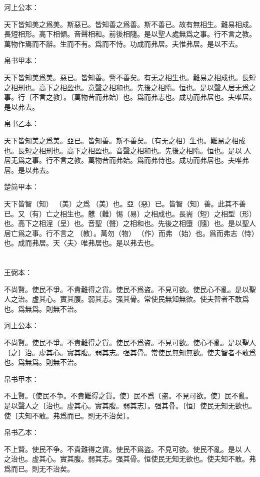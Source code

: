 \documentclass[a5paper]{ctexbook}
\begin{document}
    河上公本：

    天下皆知美之爲美。斯惡已。皆知善之爲善。斯不善已。故有無相生。難易相成。長短相形。高下相傾。音聲相和。前後相隨。是以聖人處無爲之事。行不言之教。萬物作焉而不辭。生而不有。爲而不恃。功成而弗居。夫惟弗居。是以不去。

    帛书甲本：

    天下皆知美爲美。惡已。皆知善。訾不善矣。有无之相生也。難易之相成也。長短之相刑也。高下之相盈也。意聲之相和也。先後之相隋。恒也。是以聲人居无爲之事。行〔不言之教〕。〔萬物昔而弗始〕也。爲而弗志也。成功而弗居也。夫唯居。是以弗去。

    帛书乙本：

    天下皆知美之爲美。亞已。皆知善。斯不善矣。〔有无之相〕生也。難易之相成也。長短之相刑也。高下之相盈也。音聲之相和也。先後之相隋。恒也。是以𦔻人居无爲之事。行不言之教。萬物昔而弗始。爲而弗侍也。成功而弗居也。夫唯弗居。是以弗去。

    楚简甲本：

    天下皆智（知）𢼸（美）之爲󶴲（美）也。亞（惡）已。皆智（知）善。此其不善已。又（有）亡之相生也。戁（難）惕（易）之相成也。長耑（短）之相型（形）也。高下之相浧（呈）也。音聖（聲）之相和也。先後之相墮（隨）也。是以聖人居亡爲之事。行不言之𡥈（教）。萬勿（物）󶴳（作）而弗󶴢（始）也。爲而弗志（恃）也。成而弗居。天〈夫〉唯弗居也。是以弗去也。

    \chapter{}
    王弼本：

    不尚賢。使民不爭。不貴難得之貨。使民不爲盗。不見可欲。使民心不亂。是以聖人之治。虚其心。實其腹。弱其志。强其骨。常使民無知無欲。使夫智者不敢爲也。爲無爲。則無不治。

    河上公本：

    不尚賢。使民不爭。不貴難得之貨。使民不爲盗。不見可欲。使心不亂。是以聖人〔之〕治。虚其心。實其腹。弱其志。强其骨。常使民無知無欲。使夫智者不敢爲也。爲無爲。則無不治。

    帛书甲本：

    不上賢。〔使民不争。不貴難得之貨。使〕民不爲〔盗。不見可欲。使〕民不亂。是以聲人之〔治也。虚其心。實其腹。弱其志〕。强其骨。〔恒〕使民无知无欲也。使〔夫知不敢。弗爲而已。則无不治矣〕。

    帛书乙本：

    不上賢。使民不争。不貴難得之貨。使民不爲盗。不見可欲。使民不亂。是以𦔻人之治也。虚其心。實其腹。弱其志。强其骨。恒使民无知无欲也。使夫知不敢。弗爲而已。則无不治矣。
\end{document}
